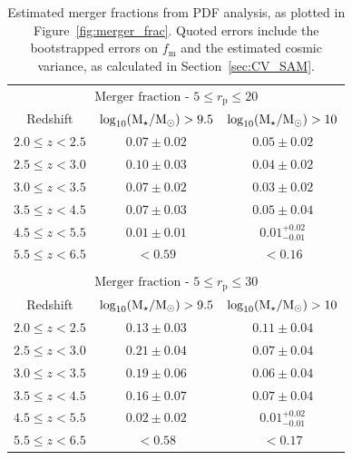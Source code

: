 \begin{table}
  \caption[Estimated merger fractions from PDF analysis, as plotted in Figure~\ref{fig:merger_frac}.]{Estimated merger fractions from PDF analysis, as plotted in Figure~\ref{fig:merger_frac}. Quoted errors include the bootstrapped errors on $f_{\text{m}}$ and the estimated cosmic variance, as calculated in Section~\ref{sec:CV_SAM}.}
\centering
  \begin{tabular}{c|cc}
   \multicolumn{3}{c}{$\text{Merger~fraction}$ - $5 \leq r_{\text{p}} \leq 20$} \\ \noalign{\smallskip}
   Redshift  & $\log_{10}(\text{M}_{\star} / \text{M}_{\odot}) > 9.5$ & $\log_{10}(\text{M}_{\star} / \text{M}_{\odot}) > 10$ \\
    \hline
   $2.0 \leq z < 2.5$ & $0.07 \pm 0.02$ & $0.05 \pm 0.02$\\
   $2.5 \leq z < 3.0$ & $0.10 \pm 0.03$&  $0.04 \pm 0.02$\\
   $3.0 \leq z < 3.5$ & $0.07 \pm 0.02$&  $0.03 \pm 0.02$ \\
   $3.5 \leq z < 4.5$ & $0.07 \pm 0.03$&  $0.05 \pm 0.04$\\
   $4.5 \leq z < 5.5$ & $0.01 \pm 0.01$&  $0.01^{+0.02}_{-0.01}$\\
   $5.5 \leq z < 6.5$ & $<  0.59$&  $< 0.16$\\  
    & & \\
    
   \multicolumn{3}{c}{$\text{Merger~fraction}$ - $5 \leq r_{\text{p}} \leq 30$} \\ \noalign{\smallskip}
   Redshift & $\log_{10}(\text{M}_{\star} / \text{M}_{\odot}) > 9.5$ & $\log_{10}(\text{M}_{\star} / \text{M}_{\odot}) > 10$ \\
    \hline
   $2.0 \leq z < 2.5$ & $0.13 \pm 0.03$ & $0.11 \pm 0.04$\\
   $2.5 \leq z < 3.0$ & $0.21 \pm 0.04$&  $0.07 \pm 0.04$\\
   $3.0 \leq z < 3.5$ & $0.19 \pm 0.06$&  $0.06 \pm 0.04$ \\
   $3.5 \leq z < 4.5$ & $0.16 \pm 0.07$&  $0.07 \pm 0.04$\\
   $4.5 \leq z < 5.5$ & $0.02 \pm 0.02$&  $0.01^{+0.02}_{-0.01}$\\
   $5.5 \leq z < 6.5$ & $<  0.58$&  $< 0.17$\\  
    
  \end{tabular}\label{tab:fmerger}
\end{table}

